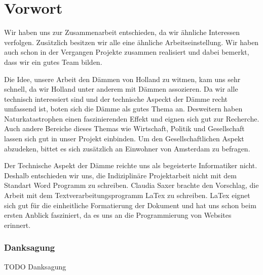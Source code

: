 \part{Vorwort}

Wir haben uns zur Zusammenarbeit entschieden, da wir ähnliche Interessen verfolgen.
Zusätzlich besitzen wir alle eine ähnliche Arbeitseinstellung. 
Wir haben auch schon in der Vergangen Projekte zusammen realisiert und dabei bemerkt, dass wir ein gutes Team bilden.
 
Die Idee, unsere Arbeit den Dämmen von Holland zu witmen, kam uns sehr schnell, da wir Holland unter anderem mit Dämmen assozieren.
Da wir alle technisch interessiert sind und der technische Aspeckt der Dämme recht umfassend ist, boten sich die Dämme als gutes Thema an. 
Desweitern haben Naturkatastrophen einen faszinierenden Effekt und eignen sich gut zur Recherche.
Auch andere Bereiche dieses Themas wie Wirtschaft, Politik und Gesellschaft lassen sich gut in unser Projekt einbinden. 
Um den Gesellschaftlichen Aspekt abzudeken, bittet es sich zusätzlich an Einwohner von Amsterdam zu befragen.

Der Technische Aspekt der Dämme reichte uns als begeisterte Informatiker nicht. Deshalb entschieden wir uns, die Indiziplinäre 
Projektarbeit nicht mit dem Standart Word Programm zu schreiben. Claudia Saxer brachte den Vorschlag, die Arbeit mit dem Textverarbeitungsprogramm
LaTex zu schreiben. 
LaTex eignet sich gut für die einheitliche Formatierung der Dokument und hat uns schon beim ersten Anblick fasziniert, da es uns an die 
Programmierung  von Websites erinnert.


\section{Danksagung}
TODO
Danksagung
